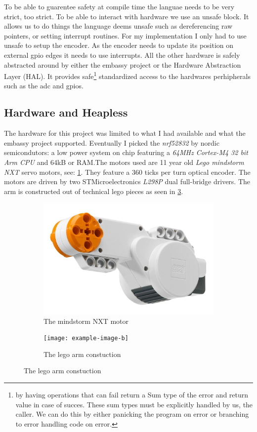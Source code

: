 \documentclass[lang=en, hanging-titles=true]{skrapport}
\begin{document}
To be able to guarentee safety at compile time the languae needs to be very strict, too strict. To be able to interact with hardware we use an unsafe block. It allows us to do things the language deems unsafe such as dereferencing raw pointers, or setting interrupt routines. For my implementation I only had to use unsafe to setup the encoder. As the encoder needs to update its position on external gpio edges it needs to use interrupts. All the other hardware is safely abstracted around by either the embassy project\cite{embassy} or the Hardware Abstraction Layer (\textsc{HAL}). It provides safe\footnote{by having operations that can fail return a Sum type of the error and return value in case of succes. These sum types must be explicitly handled by us, the caller. We can do this by either panicking the program on error or branching to error handling code on error.} standardized access to the hardwares perhipherals such as the adc and gpios.

\subsection{Hardware and Heapless}
The hardware for this project was limited to what I had available and what the embassy project supported. Eventually I picked the \textit{nrf52832} by nordic semicondutors: a low power system on chip featuring a \textit{64MHz Cortex-M4 32 bit Arm CPU} and 64kB or RAM.The motors used are 11 year old \textit{Lego mindstorm NXT} servo motors, see: \cref{fig:motor}. They feature a 360 ticks per turn optical encoder. The motors are driven by two STMicroelectronics \textit{L298P} dual full-bridge drivers. The arm is constructed out of technical lego pieces as seen in \cref{fig:arm}.
%
\begin{figure}
	\centering
	\begin{subfigure}[b]{0.5\linewidth}
		\centering
		\includegraphics[width=\linewidth]{figs/motor}
		\caption{The mindstorm NXT motor}
		\label{fig:motor}
	\end{subfigure}%
	\begin{subfigure}[b]{0.5\linewidth}
		\centering
		\texttt{[image: example-image-b]}
		\caption{The lego arm constuction}
		\label{fig:arm}
	\end{subfigure}
\end{figure}
%
\end{document}
